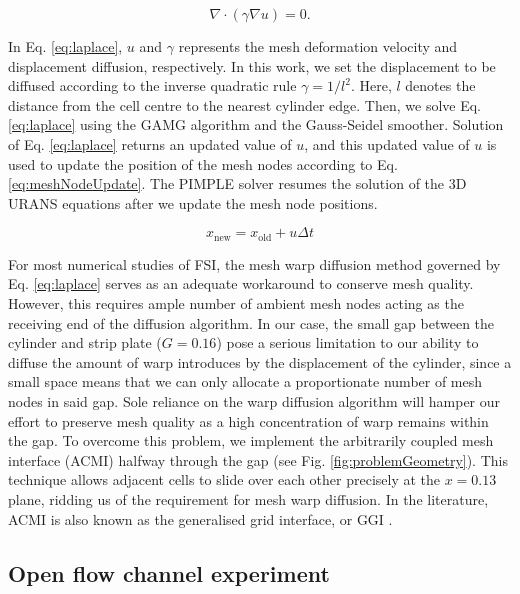 \documentclass[a4paper,fleqn]{cas-sc}
\begin{document}
\begin{equation}
  \nabla \cdot \left( \gamma \nabla u \right) = 0.
  \label{eq:laplace}
\end{equation}

In Eq. \ref{eq:laplace}, $u$ and $\gamma$ represents the mesh deformation velocity and displacement diffusion, respectively. In this work, we set the displacement to be diffused according to the inverse quadratic rule $\gamma = 1/l^{2}$. Here, $l$ denotes the distance from the cell centre to the nearest cylinder edge. Then, we solve Eq. \ref{eq:laplace} using the GAMG algorithm and the Gauss-Seidel smoother. Solution of Eq. \ref{eq:laplace} returns an updated value of $u$, and this updated value of $u$ is used to update the position of the mesh nodes according to Eq. \ref{eq:meshNodeUpdate}. The PIMPLE solver resumes the solution of the 3D URANS equations after we update the mesh node positions.

\begin{equation}
  x_{\text{new}} = x_{\text{old}} + u \Delta t
  \label{eq:meshNodeUpdate}
\end{equation}

For most numerical studies of FSI, the mesh warp diffusion method governed by Eq. \ref{eq:laplace} serves as an adequate workaround to conserve mesh quality. However, this requires ample number of ambient mesh nodes acting as the receiving end of the diffusion algorithm. In our case, the small gap between the cylinder and strip plate ($G = 0.16$) pose a serious limitation to our ability to diffuse the amount of warp introduces by the displacement of the cylinder, since a small space means that we can only allocate a proportionate number of mesh nodes in said gap. Sole reliance on the warp diffusion algorithm will hamper our effort to preserve mesh quality as a high concentration of warp remains within the gap. To overcome this problem, we implement the arbitrarily coupled mesh interface (ACMI) halfway through the gap (see Fig. \ref{fig:problemGeometry}). This technique allows adjacent cells to slide over each other precisely at the $x = 0.13$ plane, ridding us of the requirement for mesh warp diffusion. In the literature, ACMI is also known as the generalised grid interface, or GGI \citep{Zhang2018,Sun2019b}.

\subsection{Open flow channel experiment} \label{ssec:openFlowExp}
\end{document}
